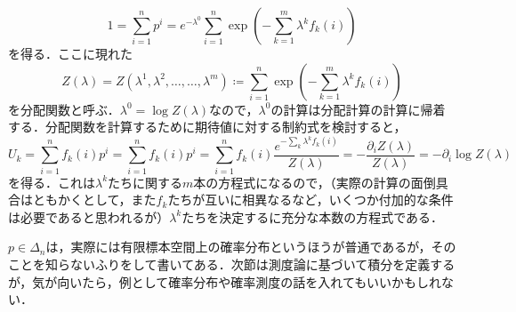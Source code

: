 \begin{exm}
\begin{itemize}
\begin{equation}
1 = \sum_{i=1}^n p^i = e^{- \lambda^0} \sum_{i=1}^n \exp\left(-\sum_{k=1}^m \lambda^k f_k(i)\right)
\end{equation}を得る．ここに現れた
\begin{equation}
Z(\lambda) = Z(\lambda^1, \lambda^2, \dots, \dots, \lambda^m) \coloneqq \sum_{i=1}^n \exp\left(-\sum_{k=1}^m \lambda^k f_k(i)\right)
\end{equation}を分配関数と呼ぶ．$\lambda^0 = \log Z(\lambda)$なので，$\lambda^0$の計算は分配計算の計算に帰着する．分配関数を計算するために期待値に対する制約式を検討すると，
\begin{equation}
U_k = \sum_{i=1}^n f_k(i)p^i = \sum_{i=1}^n f_k(i)p^i = \sum_{i=1}^n f_k(i) \frac{e^{-\sum_{k} \lambda^k f_k(i)}}{Z(\lambda)} = - \frac{\partial_i Z(\lambda)}{Z(\lambda)} = -\partial_i \log Z(\lambda)
\end{equation}を得る．これは$\lambda^k$たちに関する$m$本の方程式になるので，（実際の計算の面倒具合はともかくとして，また$f_k$たちが互いに相異なるなど，いくつか付加的な条件は必要であると思われるが）$\lambda^k$たちを決定するに充分な本数の方程式である．
\end{itemize}
\end{exm}

\begin{dig}
$p \in \Delta_n$は，実際には有限標本空間上の確率分布というほうが普通であるが，そのことを知らないふりをして書いてある．次節は測度論に基づいて積分を定義するが，気が向いたら，例として確率分布や確率測度の話を入れてもいいかもしれない．
\end{dig}

